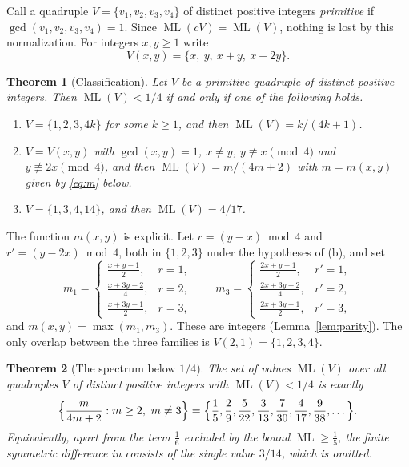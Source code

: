 \documentclass[12pt]{amsart}
\newtheorem{theorem}{Theorem}[section]
\theoremstyle{definition}\newtheorem{definition}[theorem]{Definition}
\theoremstyle{remark}\newtheorem{remark}[theorem]{Remark}
\newcommand{\ML}{\operatorname{ML}}
\begin{document}
Call a quadruple $V=\{v_1,v_2,v_3,v_4\}$ of distinct positive integers \emph{primitive} if $\gcd(v_1,v_2,v_3,v_4)=1$. Since $\ML(cV)=\ML(V)$, nothing is lost by this normalization. For integers $x,y\ge 1$ write
\[
 V(x,y)=\{x,\ y,\ x+y,\ x+2y\}.
\]

\begin{theorem}[Classification]\label{thm:main}
Let $V$ be a primitive quadruple of distinct positive integers. Then $\ML(V)<1/4$ if and only if one of the following holds.
\begin{enumerate}[label=\textup{(\alph*)},leftmargin=*]
\item $V=\{1,2,3,4k\}$ for some $k\ge 1$, and then $\ML(V)=k/(4k+1)$.
\item $V=V(x,y)$ with $\gcd(x,y)=1$, $x\ne y$, $y\not\equiv x\pmod 4$ and $y\not\equiv 2x\pmod 4$, and then $\ML(V)=m/(4m+2)$ with $m=m(x,y)$ given by \eqref{eq:m} below.
\item $V=\{1,3,4,14\}$, and then $\ML(V)=4/17$.
\end{enumerate}
\end{theorem}

The function $m(x,y)$ is explicit. Let $r=(y-x)\bmod 4$ and $r'=(y-2x)\bmod 4$, both in $\{1,2,3\}$ under the hypotheses of (b), and set
\begin{equation}\label{eq:m}
 m_1=\begin{cases}\frac{x+y-1}{2},&r=1,\\[2pt]\frac{x+3y-2}{4},&r=2,\\[2pt]\frac{x+3y-1}{2},&r=3,\end{cases}
 \qquad
 m_3=\begin{cases}\frac{2x+y-1}{2},&r'=1,\\[2pt]\frac{2x+3y-2}{4},&r'=2,\\[2pt]\frac{2x+3y-1}{2},&r'=3,\end{cases}
\end{equation}
and $m(x,y)=\max(m_1,m_3)$. These are integers (Lemma~\ref{lem:parity}). The only overlap between the three families is $V(2,1)=\{1,2,3,4\}$.

\begin{theorem}[The spectrum below $1/4$]\label{thm:values}
The set of values $\ML(V)$ over all quadruples $V$ of distinct positive integers with $\ML(V)<1/4$ is exactly
\[
 \Bigl\{\frac{m}{4m+2}: m\ge 2,\ m\ne 3\Bigr\}
 =\Bigl\{\frac15,\frac29,\frac5{22},\frac3{13},\frac7{30},\frac4{17},\frac9{38},\dots\Bigr\}.
\]
Equivalently, apart from the term $\frac16$ excluded by the bound $\ML\ge\frac15$, the finite symmetric difference in \cite[Theorem~1.3]{JainKravitz} consists of the single value $3/14$, which is omitted.
\end{theorem}
\end{document}
